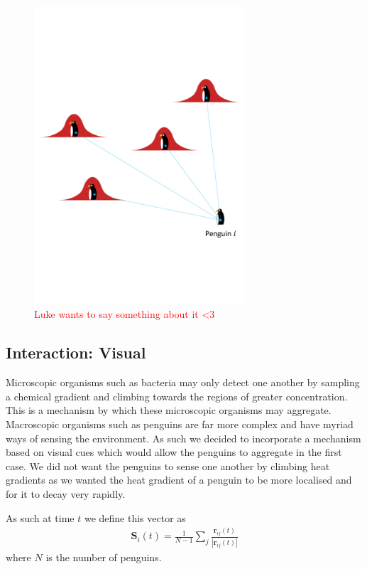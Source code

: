 \documentclass[]{scrartcl}
\newcommand{\todo}[1]{\textcolor{red}{ #1}}
\newcommand{\tb}{\textbf}
\begin{document}
\begin{figure}[H]
\centering
\includegraphics[width = 0.7\textwidth]{figs/fig4.pdf}
\caption{\todo{Luke wants to say something about it <3}}
\end{figure}

\subsection{Interaction: Visual}
Microscopic organisms such as bacteria may only detect one another by sampling a chemical gradient and climbing towards the regions of greater concentration. This is a mechanism by which these microscopic organisms may aggregate. Macroscopic organisms such as penguins are far more complex and have myriad ways of sensing the environment. As such we decided to incorporate a mechanism based on visual cues which would allow the penguins to aggregate in the first case. We did not want the penguins to sense one another by climbing heat gradients as we wanted the heat gradient of a penguin to be more localised and for it to decay very rapidly. 

As such at time $t$ we define this vector as 
\begin{align}
\tb{S}_i (t)= \frac{1}{N-1} \sum_j  \frac{\tb{r}_{ij}(t)}{|\tb{r}_{ij}(t)|}
\end{align}
where $N$ is the number of penguins. 
\end{document}
